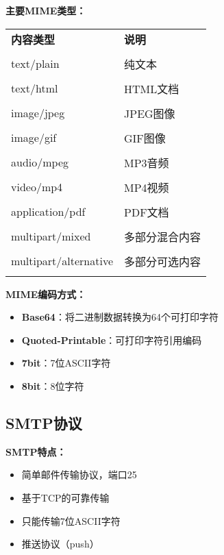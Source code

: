\documentclass[lang=cn,newtx,10pt,scheme=chinese]{../../elegantbook}
\begin{document}
\textbf{主要MIME类型：}
\begin{longtable}{@{}p{3cm}p{9cm}@{}}
\toprule
\textbf{内容类型} & \textbf{说明} \\\\ \midrule
\endhead

text/plain & 纯文本 \\\\
text/html & HTML文档 \\\\
image/jpeg & JPEG图像 \\\\
image/gif & GIF图像 \\\\
audio/mpeg & MP3音频 \\\\
video/mp4 & MP4视频 \\\\
application/pdf & PDF文档 \\\\
multipart/mixed & 多部分混合内容 \\\\
multipart/alternative & 多部分可选内容 \\\\

\bottomrule
\end{longtable}

\textbf{MIME编码方式：}
\begin{itemize}
  \item \textbf{Base64}：将二进制数据转换为64个可打印字符
  \item \textbf{Quoted-Printable}：可打印字符引用编码
  \item \textbf{7bit}：7位ASCII字符
  \item \textbf{8bit}：8位字符
\end{itemize}

\subsection{SMTP协议}

\textbf{SMTP特点：}
\begin{itemize}
  \item 简单邮件传输协议，端口25
  \item 基于TCP的可靠传输
  \item 只能传输7位ASCII字符
  \item 推送协议（push）
\end{itemize}
\end{document}
